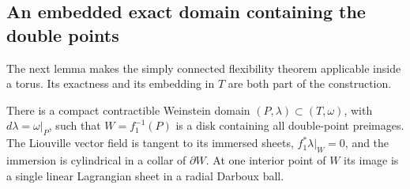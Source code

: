 \subsection{An embedded exact domain containing the double points}

The next lemma makes the simply connected flexibility theorem
applicable inside a torus.  Its exactness and its embedding in $T$
are both part of the construction.

\begin{lemma}\label{top:exact-domain}
There is a compact contractible Weinstein domain
$(P,\lambda)\subset(T,\omega)$, with $d\lambda=\omega|_P$, such
that $W=f_1^{-1}(P)$ is a disk containing all double-point
preimages.  The Liouville vector field is tangent to its immersed
sheets, $f_1^*\lambda|_W=0$, and the immersion is cylindrical in
a collar of $\partial W$.  At one interior point of $W$ its image
is a single linear Lagrangian sheet in a radial Darboux ball.
\end{lemma}

